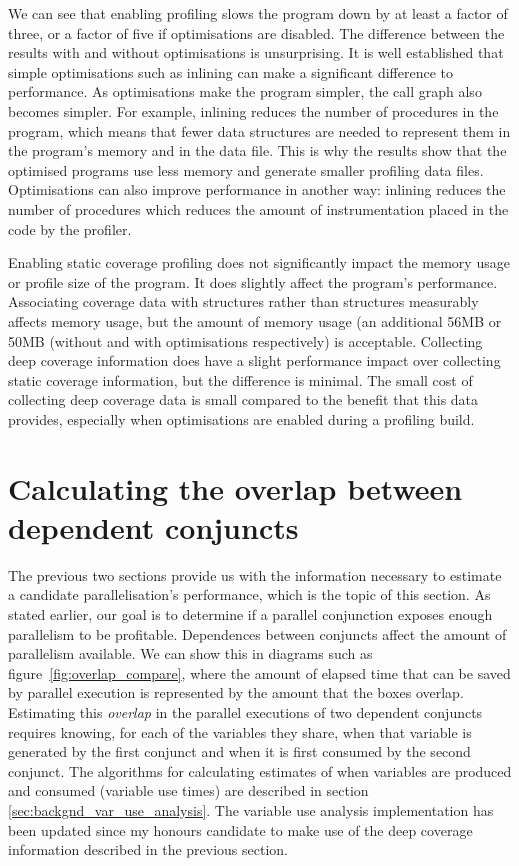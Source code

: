 We can see that enabling profiling slows the program down by at least a
factor of three,
or a factor of five if optimisations are disabled.
The difference between the results with and without optimisations is
unsurprising.
It is well established that simple optimisations such as inlining can make a
significant difference to performance.
As optimisations make the program simpler, the call graph also becomes
simpler.
For example, inlining reduces the number of procedures in the program,
which means that fewer data structures are needed to represent them in the
program's memory and in the data file.
This is why the results show that the optimised programs use less memory
and generate smaller profiling data files.
Optimisations can also improve performance in another way:
inlining reduces the number of procedures which reduces the amount of
instrumentation placed in the code by the profiler.

Enabling static coverage profiling does not significantly impact the memory
usage or profile size of the program.
It does slightly affect the program's performance.
Associating coverage data with \PD structures rather than \PS structures
measurably affects memory usage,
but the amount of memory usage (an additional 56MB or 50MB
(without and with optimisations respectively)
is acceptable.
Collecting deep coverage information does have a slight performance impact over
collecting static coverage information,
but the difference is minimal.
The small cost of collecting deep coverage data is small compared to the
benefit that this data provides,
especially when optimisations are enabled during a profiling build.


\section{Calculating the overlap between dependent conjuncts}
\label{sec:overlap_overlap_alg}


The previous two sections provide us with the information necessary to
estimate a candidate parallelisation's performance,
which is the topic of this section.
As stated earlier,
our goal is to determine if a parallel conjunction exposes enough
parallelism to be profitable.
Dependences between conjuncts affect the amount of parallelism
available.
We can show this in
diagrams such as
figure~\ref{fig:overlap_compare},
where the amount of elapsed time that can be saved by parallel execution is
represented by the amount that the boxes overlap.
Estimating this \emph{overlap}
in the parallel executions of two dependent conjuncts
requires knowing, for each of the variables they share,
when that variable is generated by the first conjunct and
when it is first consumed by the second conjunct.
The algorithms for calculating estimates of when variables are produced and
consumed
(variable use times)
are described in section \ref{sec:backgnd_var_use_analysis}.
The variable use analysis implementation has been updated since my honours
candidate to make use of the deep coverage information described in the
previous section.

